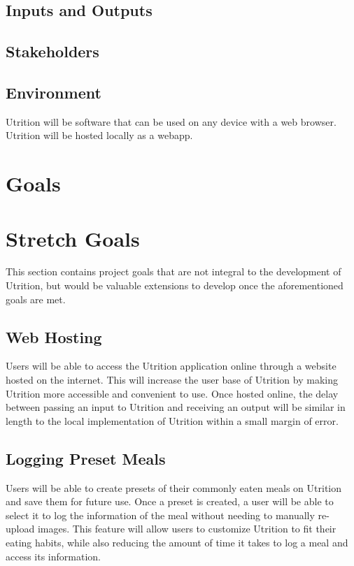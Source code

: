 \documentclass{article}
\begin{document}
\subsection{Inputs and Outputs}


\subsection{Stakeholders}

\subsection{Environment}

Utrition will be software that can be used on any device with a web browser. Utrition will be hosted locally as a webapp. 

\section{Goals}

\section{Stretch Goals}

This section contains project goals that are not integral to the development of Utrition, but would be valuable extensions to develop once the aforementioned goals are met.

\subsection{Web Hosting}

Users will be able to access the Utrition application online through a website hosted on the internet. This will increase the user base of Utrition by making Utrition more accessible and convenient to use. Once hosted online, the delay between passing an input to Utrition and receiving an output will be similar in length to the local implementation of Utrition within a small margin of error.

\subsection{Logging Preset Meals}

Users will be able to create presets of their commonly eaten meals on Utrition and save them for future use. Once a preset is created, a user will be able to select it to log the information of the meal without needing to manually re-upload images. This feature will allow users to customize Utrition to fit their eating habits, while also reducing the amount of time it takes to log a meal and access its information.
\end{document}
